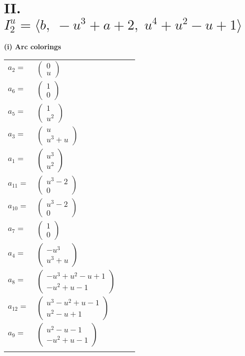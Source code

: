 \documentclass[1p]{elsarticle_modified}
\theoremstyle{definition}
\begin{document}
\centering \section*{II. $I^u_{2}= \langle b,\;- u^3+a+2,\;u^4+u^2- u+1 \rangle$}
\flushleft \textbf{(i) Arc colorings}\\
\begin{tabular}{m{7pt} m{180pt} m{7pt} m{180pt} }
\flushright $a_{2}=$&$\begin{pmatrix}0\\u\end{pmatrix}$ \\
\flushright $a_{6}=$&$\begin{pmatrix}1\\0\end{pmatrix}$ \\
\flushright $a_{5}=$&$\begin{pmatrix}1\\u^2\end{pmatrix}$ \\
\flushright $a_{3}=$&$\begin{pmatrix}u\\u^3+u\end{pmatrix}$ \\
\flushright $a_{1}=$&$\begin{pmatrix}u^3\\u^2\end{pmatrix}$ \\
\flushright $a_{11}=$&$\begin{pmatrix}u^3-2\\0\end{pmatrix}$ \\
\flushright $a_{10}=$&$\begin{pmatrix}u^3-2\\0\end{pmatrix}$ \\
\flushright $a_{7}=$&$\begin{pmatrix}1\\0\end{pmatrix}$ \\
\flushright $a_{4}=$&$\begin{pmatrix}- u^3\\u^3+u\end{pmatrix}$ \\
\flushright $a_{8}=$&$\begin{pmatrix}- u^3+u^2- u+1\\- u^2+u-1\end{pmatrix}$ \\
\flushright $a_{12}=$&$\begin{pmatrix}u^3- u^2+u-1\\u^2- u+1\end{pmatrix}$ \\
\flushright $a_{9}=$&$\begin{pmatrix}u^2- u-1\\- u^2+u-1\end{pmatrix}$\\&\end{tabular}
\end{document}
